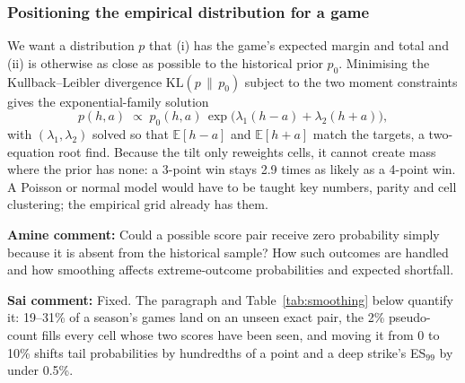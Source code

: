 \subsubsection{Positioning the empirical distribution for a game}

We want a distribution $p$ that (i) has the game's expected margin and total and (ii) is otherwise as close as possible to the historical prior $p_0$. Minimising the Kullback--Leibler divergence $\mathrm{KL}(p\,\|\,p_0)$ subject to the two moment constraints gives the exponential-family solution
\begin{equation}
p(h,a) \;\propto\; p_0(h,a)\,\exp\!\big(\lambda_1 (h-a) + \lambda_2 (h+a)\big),
\label{eq:tilt}
\end{equation}
with $(\lambda_1,\lambda_2)$ solved so that $\mathbb{E}[h-a]$ and $\mathbb{E}[h+a]$ match the targets, a two-equation root find. Because the tilt only reweights cells, it cannot create mass where the prior has none: a 3-point win stays 2.9 times as likely as a 4-point win. A Poisson or normal model would have to be taught key numbers, parity and cell clustering; the empirical grid already has them.

{\color{red}\textbf{Amine comment:} Could a possible score pair receive zero probability simply because it is absent from the historical sample? How such outcomes are handled and how smoothing affects extreme-outcome probabilities and expected shortfall.}

{\color{blue}\textbf{Sai comment:} Fixed. The paragraph and Table~\ref{tab:smoothing} below quantify it: 19--31\% of a season's games land on an unseen exact pair, the 2\% pseudo-count fills every cell whose two scores have been seen, and moving it from 0 to 10\% shifts tail probabilities by hundredths of a point and a deep strike's ES$_{99}$ by under 0.5\%.}

